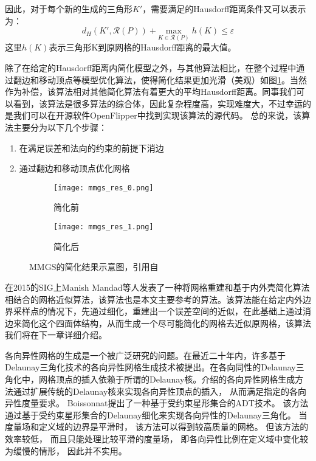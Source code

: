 因此，对于每个新的生成的三角形$K'$，需要满足的Hausdorff距离条件又可以表示为：
\begin{equation}
  d_H(K',\mathcal{R}(P))+\underset{K\in\mathcal{R}(P)}{\text{max}}\;h(K) \le \varepsilon
\end{equation}
这里$h(K)$表示三角形K到原网格的Hausdorff距离的最大值。\par
除了在给定的Hausdorff距离内简化模型之外，与其他算法相比，在整个过程中通过翻边和移动顶点等模型优化算法，使得简化结果更加光滑（美观）如图\ref{fig:mmgs-res}。当然作为补偿，该算法相对其他简化算法有着更大的平均Hausdorff距离。同事我们可以看到，该算法是很多算法的综合体，因此复杂程度高，实现难度大，不过幸运的是我们可以在开源软件OpenFlipper中找到实现该算法的源代码。
总的来说，该算法主要分为以下几个步骤：
\begin{enumerate}[（1）]
  \item 在满足误差和法向的约束的前提下消边
  \item 通过翻边和移动顶点优化网格
\end{enumerate}
\begin{figure}[htbp]
  \centering
  \begin{subfigure}[b]{0.4\textwidth}
    \texttt{[image: mmgs\_res\_0.png]}
    \caption[input]{简化前}
    \end{subfigure}
    \begin{subfigure}[b]{0.4\textwidth}
      \texttt{[image: mmgs\_res\_1.png]}
      \caption[mls]{简化后}
    \end{subfigure}
    \caption[MMGS简化结果]{MMGS的简化结果示意图，引用自\cite{mmgs}}
    \label{fig:mmgs-res}
\end{figure}

在2015的SIG上Manish Mandad等人发表了一种将网格重建和基于内外壳简化算法相结合的网格近似算法\cite{isotopic-appro}，该算法也是本文主要参考的算法。该算法能在给定内外边界采样点的情况下，先通过细化，重建出一个误差空间的近似，在此基础上通过消边来简化这个四面体结构，从而生成一个尽可能简化的网格去近似原网格，该算法我们将在下一章详细介绍。

各向异性网格的生成是一个被广泛研究的问题。在最近二十年内，许多基于Delaunay三角化技术的各向异性网格生成技术被提出。在各向同性的Delaunay三角化中，网格顶点的插入依赖于所谓的Delaunay核。\cite{Frey:2007:MGA:1205626, Dobrzynski2008}介绍的各向异性网格生成方法通过扩展传统的Delaunay核来实现各向异性顶点的插入， 从而满足指定的各向异性度量要求。 Boissonnat\cite{Boissonnat:2008:LUA:1377676.1377724, boissonnat:inria-00615486, boissonnat:hal-01146307}提出了一种基于受约束星形集合的ADT技术。 该方法通过基于受约束星形集合的Delaunay细化来实现各向异性的Delaunay三角化。 当度量场和定义域的边界是平滑时， 该方法可以得到较高质量的网格。 但该方法的效率较低， 而且只能处理比较平滑的度量场， 即各向异性比例在定义域中变化较为缓慢的情形， 因此并不实用。

